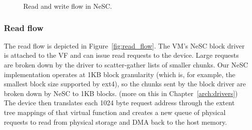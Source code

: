 \begin{figure}[!ht]

  \vspace*{-1.5ex}
  \centering
  \hfill
  \caption{Read and write flow in NeSC.\label{fig:flow}}
\end{figure}

\subsubsection{Read flow}
The read flow is depicted in Figure~\ref{fig:read_flow}. The VM's NeSC block driver is attached to the VF and can issue read requests to the device. Large requests are broken down by the driver to scatter-gather lists of smaller chunks. Our NeSC implementation operates at 1KB block granularity (which is, for example, the smallest block size supported by ext4), so the chunks sent by the block driver are broken down by NeSC to 1KB blocks. (more on this in Chapter~\ref{arch:drivers}) 
%
The device then translates each 1024 byte request address through the extent tree mappings of
that virtual function and creates a new queue of physical requests to read from physical storage
and DMA back to the host memory.

